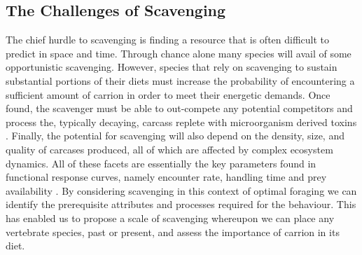 \documentclass[a4paper,12pt]{article}
\begin{document}

\subsection*{The Challenges of Scavenging} %
The chief hurdle to scavenging is finding a resource that is often difficult to predict in space and time.
Through chance alone many species will avail of some opportunistic scavenging. %
However, species that rely on scavenging to sustain substantial portions of their diets must increase the probability of encountering a sufficient amount of carrion in order to meet their energetic demands.
Once found, the scavenger must be able to out-compete any potential  competitors and process the, typically decaying, carcass replete with microorganism derived toxins  \citep{ruxton2014fruit}.
Finally, the potential for scavenging will also depend on the density, size, and quality of carcases produced, all of which are affected by complex ecosystem dynamics.
All of these facets are essentially the key parameters found in functional response curves, namely encounter rate, handling time and prey availability \citep{jeschke2002predator}. %
By considering scavenging in this context of optimal foraging we can identify the prerequisite attributes and processes required for the behaviour. 
This has enabled us to propose a scale of scavenging whereupon we can place any vertebrate species, past or present, and assess the importance of carrion in its diet. 
\end{document}
